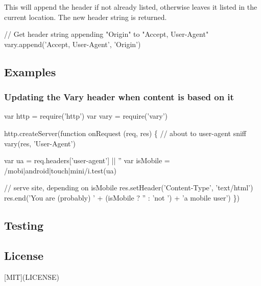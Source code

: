 This will append the header if not already listed, otherwise leaves it listed in the current location. The new header string is returned.


\begin{DoxyCode}
// Get header string appending "Origin" to "Accept, User-Agent"
vary.append('Accept, User-Agent', 'Origin')
\end{DoxyCode}


\subsection*{Examples}

\subsubsection*{Updating the Vary header when content is based on it}


\begin{DoxyCode}
var http = require('http')
var vary = require('vary')

http.createServer(function onRequest (req, res) \{
  // about to user-agent sniff
  vary(res, 'User-Agent')

  var ua = req.headers['user-agent'] || ''
  var isMobile = /mobi|android|touch|mini/i.test(ua)

  // serve site, depending on isMobile
  res.setHeader('Content-Type', 'text/html')
  res.end('You are (probably) ' + (isMobile ? '' : 'not ') + 'a mobile user')
\})
\end{DoxyCode}


\subsection*{Testing}




\subsection*{License}

\mbox{[}M\+IT\mbox{]}(L\+I\+C\+E\+N\+SE) 